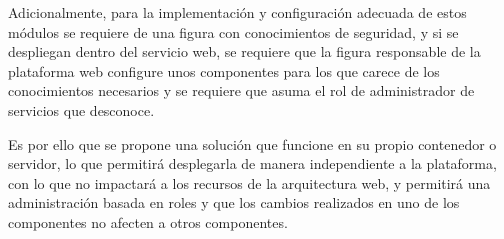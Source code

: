 \par Adicionalmente, para la implementación y configuración adecuada de estos módulos se requiere de una figura con
conocimientos de seguridad, y si se despliegan dentro del servicio web, se requiere que la figura responsable de la
plataforma web configure unos componentes para los que carece de los conocimientos necesarios y se requiere que asuma
el rol de administrador de servicios que desconoce.
\par Es por ello que se propone una solución que funcione en su propio contenedor o servidor, lo
que permitirá desplegarla de manera independiente a la plataforma, con lo que no impactará a los recursos de la
arquitectura web, y permitirá una administración basada en roles y que los cambios realizados en uno de los
componentes no afecten a otros componentes.

